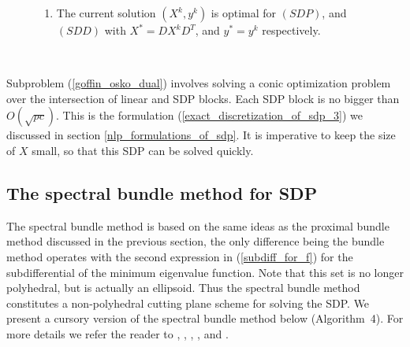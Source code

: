\documentclass[12pt]{kluwer}
\begin{document}
\begin{article}
\begin{figure}
{\begin{minipage}{\textwidth}
\begin{enumerate}
eigenvectors $d_i^k$, $i=1,\ldots,r^k$. Here $r^k$ is the multiplicity of this eigenvalue.
Typically $r^k \le O(\sqrt{pc})$.  Also, update the lower and upper bounds as in Algorithm~1.
If $\lambda_{min}(C-\mathcal{A}^Ty^k)$ is small, or the difference between the computed
bounds is less than the specified tolerance go to step 4. Else,
set $D_k = [d_1^k,\ldots,d_{r^k}^k]$. This gives the valid cutting plane
\begin{displaymath}
\begin{array}{lrcc}
\sum_{i=1}^{pc}y_i(D_k^TA_iD_k) & \preceq & D_k^TCD_k
\end{array}
\end{displaymath}
Add this SDP constraint to (\ref{goffin_osko_primal}), and update
$D = [D; D_k]$. Set $k=k+1$, and return to step 2.
\item The current solution $(X^k,y^k)$ is optimal for $(SDP)$, and $(SDD)$ with
$X^* = DX^kD^T$, and $y^* = y^k$ respectively.
\end{enumerate}
\end{minipage}
}  \\
\end{figure}
Subproblem (\ref{goffin_osko_dual}) involves solving a conic optimization problem over the intersection of
linear and SDP blocks. Each SDP block is no bigger than $O(\sqrt{pc})$. 
This is the formulation (\ref{exact_discretization_of_sdp_3})
we discussed in section \ref{nlp_formulations_of_sdp}. 
It is imperative to keep the size of $X$ small, so that this
SDP can be solved quickly. 

\subsection{The spectral bundle method for SDP}

\label{spectral_bundle_scheme}
The spectral bundle method is based on the same ideas as the proximal bundle method discussed 
in the previous section, the only difference being the bundle method operates with the second
expression in (\ref{subdiff_for_f}) for the subdifferential of the minimum eigenvalue function.
Note that this set is no longer polyhedral, but is actually an ellipsoid. Thus the spectral bundle
method constitutes a non-polyhedral cutting plane scheme for solving the SDP. We present
a cursory version of the spectral bundle method below (Algorithm~4). For more details we refer
the reader to , , 
, , and
.


\end{article}
\end{document}
